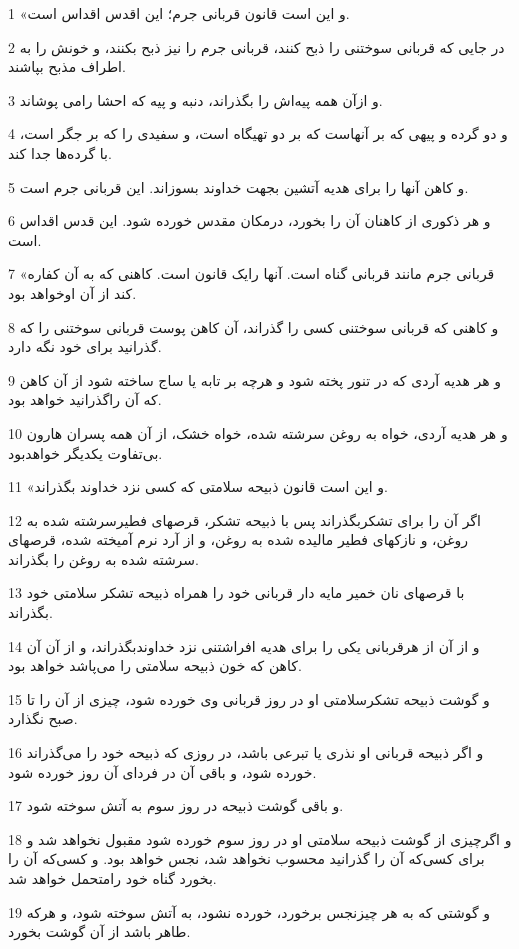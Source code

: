 \par 1 «و این است قانون قربانی جرم؛ این اقدس اقداس است.
\par 2 در جایی که قربانی سوختنی را ذبح کنند، قربانی جرم را نیز ذبح بکنند، و خونش را به اطراف مذبح بپاشند.
\par 3 و ازآن همه پیه‌اش را بگذراند، دنبه و پیه که احشا رامی پوشاند.
\par 4 و دو گرده و پیهی که بر آنهاست که بر دو تهیگاه است، و سفیدی را که بر جگر است، با گرده‌ها جدا کند.
\par 5 و کاهن آنها را برای هدیه آتشین بجهت خداوند بسوزاند. این قربانی جرم است.
\par 6 و هر ذکوری از کاهنان آن را بخورد، درمکان مقدس خورده شود. این قدس اقداس است.
\par 7 «قربانی جرم مانند قربانی گناه است. آنها رایک قانون است. کاهنی که به آن کفاره کند از آن اوخواهد بود.
\par 8 و کاهنی که قربانی سوختنی کسی را گذراند، آن کاهن پوست قربانی سوختنی را که گذرانید برای خود نگه دارد.
\par 9 و هر هدیه آردی که در تنور پخته شود و هر‌چه بر تابه یا ساج ساخته شود از آن کاهن که آن راگذرانید خواهد بود.
\par 10 و هر هدیه آردی، خواه به روغن سرشته شده، خواه خشک، از آن همه پسران هارون بی‌تفاوت یکدیگر خواهدبود.
\par 11 «و این است قانون ذبیحه سلامتی که کسی نزد خداوند بگذراند.
\par 12 اگر آن را برای تشکربگذراند پس با ذبیحه تشکر، قرصهای فطیرسرشته شده به روغن، و نازکهای فطیر مالیده شده به روغن، و از آرد نرم آمیخته شده، قرصهای سرشته شده به روغن را بگذراند.
\par 13 با قرصهای نان خمیر مایه دار قربانی خود را همراه ذبیحه تشکر سلامتی خود بگذراند.
\par 14 و از آن از هرقربانی یکی را برای هدیه افراشتنی نزد خداوندبگذراند، و از آن آن کاهن که خون ذبیحه سلامتی را می‌پاشد خواهد بود.
\par 15 و گوشت ذبیحه تشکرسلامتی او در روز قربانی وی خورده شود، چیزی از آن را تا صبح نگذارد.
\par 16 و اگر ذبیحه قربانی او نذری یا تبرعی باشد، در روزی که ذبیحه خود را می‌گذراند خورده شود، و باقی آن در فردای آن روز خورده شود.
\par 17 و باقی گوشت ذبیحه در روز سوم به آتش سوخته شود.
\par 18 و اگرچیزی از گوشت ذبیحه سلامتی او در روز سوم خورده شود مقبول نخواهد شد و برای کسی‌که آن را گذرانید محسوب نخواهد شد، نجس خواهد بود. و کسی‌که آن را بخورد گناه خود رامتحمل خواهد شد.
\par 19 و گوشتی که به هر چیزنجس برخورد، خورده نشود، به آتش سوخته شود، و هر‌که طاهر باشد از آن گوشت بخورد.
